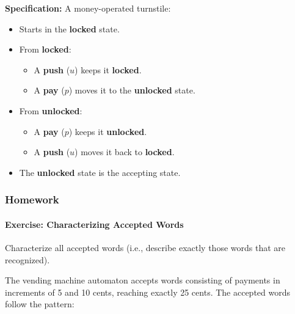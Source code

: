 \documentclass{article}
\theoremstyle{theorem}
\theoremstyle{definition}
\theoremstyle{remark}
\begin{document}
\textbf{Specification:} A money-operated turnstile:
\begin{itemize}
    \item Starts in the \textbf{locked} state.
    \item From \textbf{locked}:
    \begin{itemize}
        \item A \textbf{push} (\( u \)) keeps it \textbf{locked}.
        \item A \textbf{pay} (\( p \)) moves it to the \textbf{unlocked} state.
    \end{itemize}
    \item From \textbf{unlocked}:
    \begin{itemize}
        \item A \textbf{pay} (\( p \)) keeps it \textbf{unlocked}.
        \item A \textbf{push} (\( u \)) moves it back to \textbf{locked}.
    \end{itemize}
    \item The \textbf{unlocked} state is the accepting state.
\end{itemize}

\begin{center}
\end{center}

\subsubsection{Homework}

\paragraph*{Exercise: Characterizing Accepted Words}

Characterize all accepted words (i.e., describe exactly those words that are recognized).

The vending machine automaton accepts words consisting of payments in increments of 5 and 10 cents, reaching exactly 25 cents. The accepted words follow the pattern:
\end{document}
